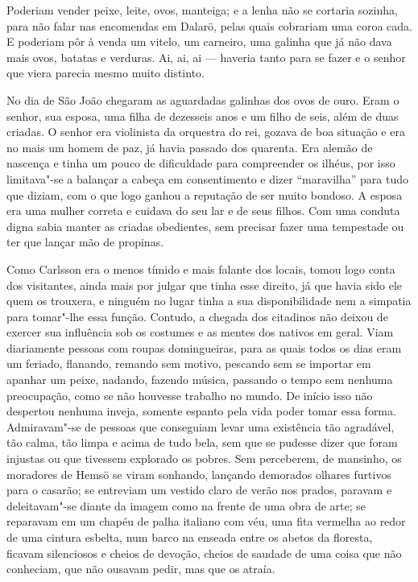 Poderiam vender peixe, leite, ovos, manteiga; e a lenha não se cortaria sozinha,
para não falar nas encomendas em Dalarö, pelas quais cobrariam uma coroa cada.
E poderiam pôr à venda um vitelo, um carneiro, uma galinha que já não dava mais
ovos, batatas e verduras. Ai, ai, ai --- haveria tanto para se fazer e o senhor
que viera parecia mesmo muito distinto.

No dia de São João chegaram as aguardadas galinhas dos ovos de ouro. Eram o
senhor, sua esposa, uma filha de dezesseis anos e um filho de seis, além de duas
criadas. O senhor era violinista da orquestra do rei, gozava de boa situação e
era no mais um homem de paz, já havia passado dos quarenta. Era alemão de
nascença e tinha um pouco de dificuldade para compreender os ilhéus, por isso
limitava"-se a balançar a cabeça em consentimento e dizer ``maravilha'' para tudo
que diziam, com o que logo ganhou a reputação de ser muito bondoso. A esposa
era uma mulher correta e cuidava do seu lar e de seus filhos. Com uma conduta
digna sabia manter as criadas obedientes, sem precisar fazer uma tempestade ou
ter que lançar mão de propinas.

Como Carlsson era o menos tímido e mais falante dos locais, tomou logo conta dos
visitantes, ainda mais por julgar que tinha esse direito, já que havia sido ele quem os
trouxera, e ninguém no lugar tinha a sua disponibilidade nem a simpatia para
tomar"-lhe essa função. Contudo, a chegada dos citadinos não deixou de exercer sua
influência sob os costumes e as mentes dos nativos em geral. Viam diariamente
pessoas com roupas domingueiras, para as quais todos os dias eram um feriado,
flanando, remando sem motivo, pescando sem se importar em apanhar um peixe,
nadando, fazendo música, passando o tempo sem nenhuma preocupação, como se não
houvesse trabalho no mundo. De início isso não despertou nenhuma inveja, somente
espanto pela vida poder tomar essa forma. Admiravam"-se de pessoas que conseguiam
levar uma existência tão agradável, tão calma, tão limpa e acima de tudo bela,
sem que se pudesse dizer que foram injustas ou que tivessem explorado os pobres.
Sem perceberem, de mansinho, os moradores de Hemsö se viram sonhando, lançando
demorados olhares furtivos para o casarão; se entreviam um vestido claro de
verão nos prados, paravam e deleitavam"-se diante da imagem como na frente de uma
obra de arte; se reparavam em um chapéu de palha italiano com véu, uma fita
vermelha ao redor de uma cintura esbelta, num barco na enseada entre os abetos
da floresta, ficavam silenciosos e cheios de devoção, cheios de saudade de
uma coisa que não conheciam, que não ousavam pedir, mas que os atraía.

